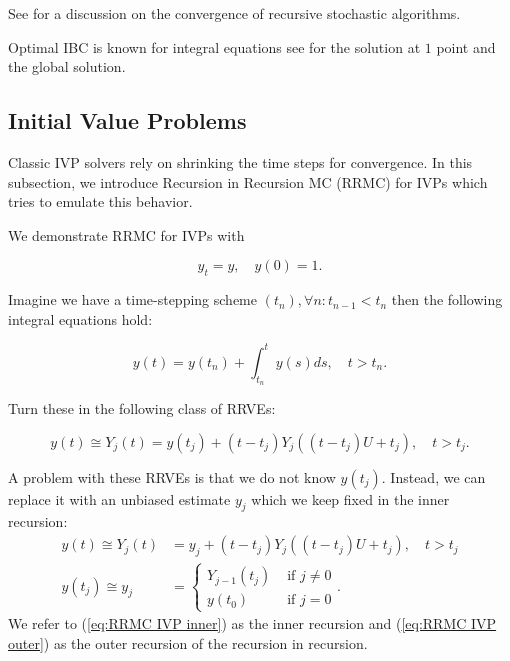 \documentclass[a4paper,12pt]{article}
\begin{document}
\begin{related}
    See \cite{gupta_convergence_2021} for a discussion on the convergence
    of recursive stochastic algorithms.
\end{related}


\begin{related}
    Optimal IBC is known for integral equations see \cite{heinrich_monte_1998}
    for the solution at $1$ point and the global solution.
\end{related}

\subsection{Initial Value Problems}
Classic IVP solvers rely on shrinking the time steps for
convergence. In this subsection, we introduce
Recursion in Recursion MC (RRMC) for IVPs which tries to emulate
this behavior.


\begin{example}[RRMC $y_t=y$] \label{ex:RRMC IVP}
    We demonstrate RRMC for IVPs with

    \begin{equation}
        y_t = y, \quad y(0) = 1.
    \end{equation}

    Imagine we have a time-stepping scheme $(t_{n}), \forall n: t_{n-1} < t_{n}$
    then the following integral equations hold:

    \begin{equation}
        y(t)= y(t_{n}) + \int_{t_{n}}^{t}y(s)ds , \quad t>t_{n}.
    \end{equation}

    Turn these in the following class of RRVEs:

    \begin{equation}
        y(t) \cong Y_{j}(t) = y(t_{j}) + (t-t_{j})Y_{j}((t-t_{j})U+t_{j}), \quad t>t_{j}.
    \end{equation}

    A problem with these RRVEs is that we do not know $y(t_{j})$.
    Instead, we can replace it with an unbiased estimate $y_{j}$
    which we keep fixed in the inner recursion:
    \begin{align}
        \label{eq:RRMC IVP inner}
        y(t) \cong Y_{j}(t)  & = y_{j} + (t-t_{j})Y_{j}((t-t_{j})U+t_{j}), \quad t>t_{j} \\
        y(t_{j}) \cong y_{j} & = \begin{cases}
                                     Y_{j-1}(t_{j}) & \text{ if } j \neq 0 \\
                                     y(t_{0})       & \text{ if } j = 0
                                 \end{cases}.
        \label{eq:RRMC IVP outer}
    \end{align}
    We refer to (\ref{eq:RRMC IVP inner}) as the inner recursion and
    (\ref{eq:RRMC IVP outer}) as the outer recursion of the recursion in
    recursion.
\end{example}
\end{document}
